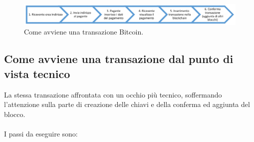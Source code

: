 \begin{figure}[H]
	\centering
	\includegraphics[width=\textwidth]{images/transazioneBitcoin.png}
	\caption{Come avviene una transazione Bitcoin.}
	\label{fig:bitcoinTransaction}
\end{figure}

\subsection{Come avviene una transazione dal punto di vista tecnico}
\label{sec:come avviene una transazione dal punto di vista tecnico}
La stessa transazione affrontata con un occhio più tecnico, soffermando l'attenzione sulla parte di creazione delle chiavi e della conferma ed aggiunta del blocco.
\\
\\I passi da eseguire sono:
